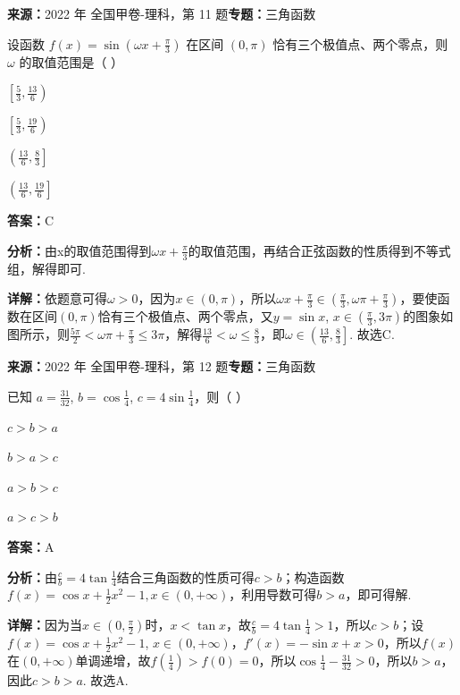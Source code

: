 \begin{question}[points=5]
\textbf{来源：}2022 年 全国甲卷-理科，第 11 题\quad \textbf{专题：}三角函数\par
设函数 $f(x)=\sin\left(\omega x+\frac{\pi}{3}\right)$ 在区间 $(0,\pi)$ 恰有三个极值点、两个零点，则 $\omega$ 的取值范围是（ ）
\begin{choices}
  \item $\left[\frac{5}{3},\frac{13}{6}\right)$
  \item $\left[\frac{5}{3},\frac{19}{6}\right)$
  \item $\left(\frac{13}{6},\frac{8}{3}\right]$
  \item $\left(\frac{13}{6},\frac{19}{6}\right]$
\end{choices}
\begin{solution}
\textbf{答案：}C

\textbf{分析：}由x的取值范围得到$\omega x+\frac{\pi}{3}$的取值范围，再结合正弦函数的性质得到不等式组，解得即可.

\textbf{详解：}依题意可得$\omega>0$，因为$x\in(0,\pi)$，所以$\omega x+\frac{\pi}{3}\in\left(\frac{\pi}{3},\omega\pi+\frac{\pi}{3}\right)$，要使函数在区间$(0,\pi)$恰有三个极值点、两个零点，又$y=\sin x$, $x\in\left(\frac{\pi}{3},3\pi\right)$的图象如图所示，则$\frac{5\pi}{2}<\omega\pi+\frac{\pi}{3}\leq 3\pi$，解得$\frac{13}{6}<\omega\leq\frac{8}{3}$，即$\omega\in\left(\frac{13}{6},\frac{8}{3}\right]$. 故选C.
\end{solution}
\end{question}

\begin{question}[points=5]
\textbf{来源：}2022 年 全国甲卷-理科，第 12 题\quad \textbf{专题：}三角函数\par
已知 $a=\frac{31}{32}$, $b=\cos\frac{1}{4}$, $c=4\sin\frac{1}{4}$，则（ ）
\begin{choices}
  \item $c>b>a$
  \item $b>a>c$
  \item $a>b>c$
  \item $a>c>b$
\end{choices}
\begin{solution}
\textbf{答案：}A

\textbf{分析：}由$\frac{c}{b}=4\tan\frac{1}{4}$结合三角函数的性质可得$c>b$；构造函数$f(x)=\cos x+\frac{1}{2}x^2-1, x\in(0,+\infty)$，利用导数可得$b>a$，即可得解.

\textbf{详解：}因为当$x\in(0,\frac{\pi}{2})$时，$x<\tan x$，故$\frac{c}{b}=4\tan\frac{1}{4}>1$，所以$c>b$；设$f(x)=\cos x+\frac{1}{2}x^2-1$, $x\in(0,+\infty)$，$f'(x)=-\sin x+x>0$，所以$f(x)$在$(0,+\infty)$单调递增，故$f(\frac{1}{4})>f(0)=0$，所以$\cos\frac{1}{4}-\frac{31}{32}>0$，所以$b>a$，因此$c>b>a$. 故选A.
\end{solution}
\end{question}

